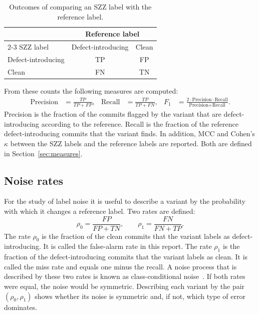 \documentclass[12pt,a4paper,oneside]{report}
\newcommand{\rhoz}{\rho_0}
\newcommand{\rhoo}{\rho_1}
\begin{document}
\begin{table}[htbp]
\centering\small
\caption{Outcomes of comparing an SZZ label with the reference label.}
\label{tab:confusion}
\begin{tabular}{@{}lcc@{}}
\toprule
 & \multicolumn{2}{c}{Reference label} \\
\cmidrule(l){2-3}
SZZ label & Defect-introducing & Clean \\
\midrule
Defect-introducing & TP & FP \\
Clean & FN & TN \\
\bottomrule
\end{tabular}
\end{table}

From these counts the following measures are computed:
\begin{align}
\text{Precision} &= \frac{TP}{TP+FP}, &
\text{Recall} &= \frac{TP}{TP+FN}, &
F_1 &= \frac{2\cdot\text{Precision}\cdot\text{Recall}}{\text{Precision}+\text{Recall}}.
\end{align}
Precision is the fraction of the commits flagged by the variant that are
defect-introducing according to the reference. Recall is the fraction of the
reference defect-introducing commits that the variant finds. In addition, MCC
and Cohen's $\kappa$ between the SZZ labels and the reference labels are
reported. Both are defined in Section~\ref{sec:measures}.

\subsection{Noise rates}

For the study of label noise it is useful to describe a variant by the
probability with which it changes a reference label. Two rates are defined:
\begin{equation}
\rhoz = \frac{FP}{FP+TN}, \qquad \rhoo = \frac{FN}{FN+TP}.
\label{eq:rho}
\end{equation}
The rate $\rhoz$ is the fraction of the clean commits that the variant labels
as defect-introducing. It is called the false-alarm rate in this report. The
rate $\rhoo$ is the fraction of the defect-introducing commits that the
variant labels as clean. It is called the miss rate and equals one minus the
recall. A noise process that is described by these two rates is known as
class-conditional noise~\cite{natarajan2013noisy}. If both rates were equal,
the noise would be symmetric. Describing each variant by the pair
$(\rhoz,\rhoo)$ shows whether its noise is symmetric and, if not, which type
of error dominates.
\end{document}

